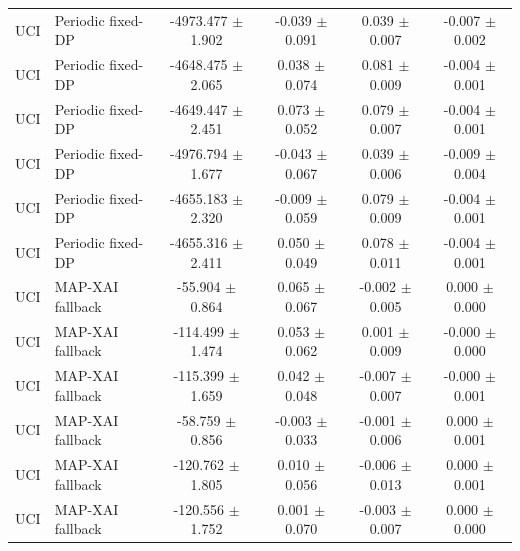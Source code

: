 \begin{table}[t]
\begin{tabular}{llcccc}
UCI & Periodic fixed-DP & -4973.477 $\pm$ 1.902 & -0.039 $\pm$ 0.091 & 0.039 $\pm$ 0.007 & -0.007 $\pm$ 0.002 \\
UCI & Periodic fixed-DP & -4648.475 $\pm$ 2.065 & 0.038 $\pm$ 0.074 & 0.081 $\pm$ 0.009 & -0.004 $\pm$ 0.001 \\
UCI & Periodic fixed-DP & -4649.447 $\pm$ 2.451 & 0.073 $\pm$ 0.052 & 0.079 $\pm$ 0.007 & -0.004 $\pm$ 0.001 \\
UCI & Periodic fixed-DP & -4976.794 $\pm$ 1.677 & -0.043 $\pm$ 0.067 & 0.039 $\pm$ 0.006 & -0.009 $\pm$ 0.004 \\
UCI & Periodic fixed-DP & -4655.183 $\pm$ 2.320 & -0.009 $\pm$ 0.059 & 0.079 $\pm$ 0.009 & -0.004 $\pm$ 0.001 \\
UCI & Periodic fixed-DP & -4655.316 $\pm$ 2.411 & 0.050 $\pm$ 0.049 & 0.078 $\pm$ 0.011 & -0.004 $\pm$ 0.001 \\
UCI & MAP-XAI fallback & -55.904 $\pm$ 0.864 & 0.065 $\pm$ 0.067 & -0.002 $\pm$ 0.005 & 0.000 $\pm$ 0.000 \\
UCI & MAP-XAI fallback & -114.499 $\pm$ 1.474 & 0.053 $\pm$ 0.062 & 0.001 $\pm$ 0.009 & -0.000 $\pm$ 0.000 \\
UCI & MAP-XAI fallback & -115.399 $\pm$ 1.659 & 0.042 $\pm$ 0.048 & -0.007 $\pm$ 0.007 & -0.000 $\pm$ 0.001 \\
UCI & MAP-XAI fallback & -58.759 $\pm$ 0.856 & -0.003 $\pm$ 0.033 & -0.001 $\pm$ 0.006 & 0.000 $\pm$ 0.001 \\
UCI & MAP-XAI fallback & -120.762 $\pm$ 1.805 & 0.010 $\pm$ 0.056 & -0.006 $\pm$ 0.013 & 0.000 $\pm$ 0.001 \\
UCI & MAP-XAI fallback & -120.556 $\pm$ 1.752 & 0.001 $\pm$ 0.070 & -0.003 $\pm$ 0.007 & 0.000 $\pm$ 0.000 \\
\bottomrule
\end{tabular}
\end{table}
